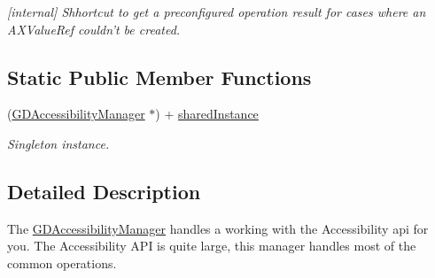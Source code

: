 \begin{DoxyCompactItemize}
\begin{DoxyCompactList}\small\item\em \mbox{[}internal\mbox{]} Shhortcut to get a preconfigured operation result for cases where an AXValueRef couldn't be created. \item\end{DoxyCompactList}\end{DoxyCompactItemize}
\subsection*{Static Public Member Functions}
\begin{DoxyCompactItemize}
\item 
\hypertarget{interface_g_d_accessibility_manager_a435dd479b497690d4c34fe71da196da6}{
(\hyperlink{interface_g_d_accessibility_manager}{GDAccessibilityManager} $\ast$) + \hyperlink{interface_g_d_accessibility_manager_a435dd479b497690d4c34fe71da196da6}{sharedInstance}}
\label{interface_g_d_accessibility_manager_a435dd479b497690d4c34fe71da196da6}

\begin{DoxyCompactList}\small\item\em Singleton instance. \item\end{DoxyCompactList}\end{DoxyCompactItemize}


\subsection{Detailed Description}
The \hyperlink{interface_g_d_accessibility_manager}{GDAccessibilityManager} handles a working with the Accessibility api for you. The Accessibility API is quite large, this manager handles most of the common operations.

